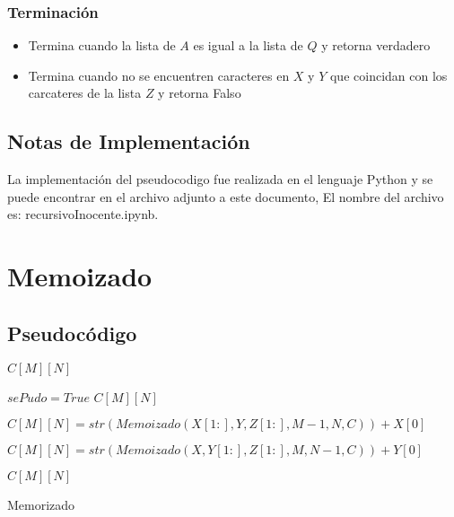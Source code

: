 \documentclass[]{article}
\numberwithin{equation}{section}
\numberwithin{figure}{section}
\theoremstyle{definition}
\begin{document}
	\subsubsection*{Terminación}
	\begin{itemize}
	\item Termina cuando la lista de $A$ es igual a la lista de $Q$ y retorna verdadero
	\item Termina cuando no se encuentren caracteres en $X$ y $Y$ que coincidan con los carcateres de la lista $Z$ y retorna Falso
	\end{itemize}
	
	\subsection*{Notas de Implementación}
	
	\text La implementación del pseudocodigo fue realizada en el lenguaje Python y se puede encontrar en el archivo adjunto a este documento, El nombre del archivo es: recursivoInocente.ipynb.

\section*{Memoizado}

	\subsection*{Pseudocódigo}
	
	\begin{algorithm}[H]
	\begin{algorithmic}[1]
	
	
		\State\Return $C[M][N]$
	\EndIf
	
		\State $sePudo = True$
		\State\Return $C[M][N]$
	\EndIf
	
				\State $C[M][N] = str(Memoizado(X[1:],Y,Z[1:],M-1,N,C))+X[0]$
			\EndIf
		\EndIf
		
				\State $C[M][N] = str(Memoizado(X,Y[1:],Z[1:],M,N-1,C))+Y[0]$
			\EndIf
		\EndIf
	\EndIf
	
	\State\Return $C[M][N]$	
	
	\EndProcedure
	
	\end{algorithmic}
	\caption{\foreignlanguage{english}{Memorizado}}
	\end{algorithm}
	
\end{document}
